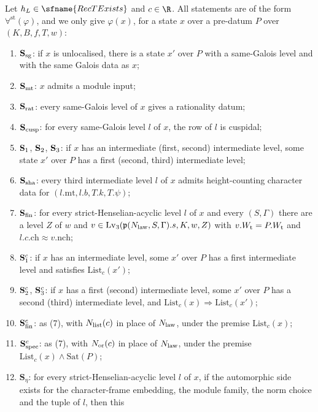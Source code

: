 \begin{definition}\label{pf:baselat2:stagedefs}
Let $h_L\in\sfname{RecTExists}$ and $c\in\R$. All statements are of the form $\forall^{\mathrm{st}}(\varphi)$, and we
only give $\varphi(x)$, for a state $x$ over a pre-datum $P$ over $(K,B,f,T,w)$:
\begin{enumerate}[label=(\arabic*)]
\item $\mathbf{S}_{\mathrm{sg}}$: if $x$ is unlocalised, there is a state $x'$ over $P$ with a same-Galois level and with
  the same Galois data as $x$;
\item $\mathbf{S}_{\mathrm{mt}}$: $x$ admits a module input;
\item $\mathbf{S}_{\mathrm{rat}}$: every same-Galois level of $x$ gives a rationality datum;
\item $\mathbf{S}_{\mathrm{cusp}}$: for every same-Galois level $l$ of $x$, the row of $l$ is cuspidal;
\item $\mathbf{S}_{\mathrm{1}}$, $\mathbf{S}_{\mathrm{2}}$, $\mathbf{S}_{\mathrm{3}}$: if $x$ has an intermediate (first, second) intermediate level,
  some state $x'$ over $P$ has a first (second, third) intermediate level;
\item $\mathbf{S}_{\mathrm{sha}}$: every third intermediate level $l$ of $x$ admits height-counting character data for
  $(l.\mathrm{mt},l.b,T.k,T.\psi)$;
\item $\mathbf{S}_{\mathrm{fin}}$: for every strict-Henselian-acyclic level $l$ of $x$ and every $(S,\Gamma)$ there are a
  level $Z$ of $w$ and $v\in\mathrm{Lv}_3(\mathfrak{p}(N_{\mathrm{law}},S,\Gamma).s,K,w,Z)$ with $v.W_{\mathrm{t}}=P.W_{\mathrm{t}}$
  and $l.c.\mathrm{ch}\approx v.\mathrm{nch}$;
\item $\mathbf{S}_{\mathrm{1}}^{c}$: if $x$ has an intermediate level, some $x'$ over $P$ has a first intermediate level
  and satisfies $\mathrm{List}_c(x')$;
\item $\mathbf{S}_{\mathrm{2}}^{c}$, $\mathbf{S}_{\mathrm{3}}^{c}$: if $x$ has a first (second) intermediate level, some $x'$ over $P$
  has a second (third) intermediate level, and $\mathrm{List}_c(x)\Rightarrow\mathrm{List}_c(x')$;
\item $\mathbf{S}_{\mathrm{fin}}^{c}$: as (7), with $N_{\mathrm{list}}(c)$ in place of $N_{\mathrm{law}}$, under the premise
  $\mathrm{List}_c(x)$;
\item $\mathbf{S}_{\mathrm{spec}}^{c}$: as (7), with $N_{\mathrm{or}}(c)$ in place of $N_{\mathrm{law}}$, under the premise
  $\mathrm{List}_c(x)\wedge\mathrm{Sat}(P)$;
\item $\mathbf{S}_{\eta}$: for every strict-Henselian-acyclic level $l$ of $x$, if the automorphic side
  exists for the character-frame embedding, the module family, the norm choice and the tuple of $l$, then this

\end{enumerate}
\end{definition}

